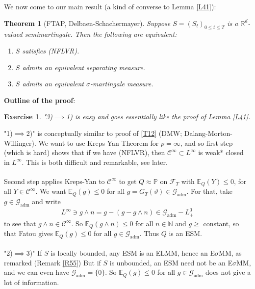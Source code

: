 \documentclass[12pt,a4paper, twoside]{article}
\newtheorem{thm}{Theorem}[section]
\newtheorem{exe}{Exercise}[section]
\theoremstyle{definition}
\newcommand{\EE}{\mathbb{E}} %
\newcommand{\PP}{\mathbb{P}} %
\begin{document}
\newpage
We now come to our main result (a kind of converse to Lemma \ref{L41}):
\begin{mdframed}[backgroundcolor=yellow!20, topline=true, linewidth=2.0pt]
\begin{thm}[FTAP, Delbaen-Schachermayer] \label{T45} Suppose $S=(S_t)_{0 \leq t \leq T}$ is a $\mathbb{R}^d$-valued semimartingale. Then the following are equivalent:
\begin{enumerate}
\item $S$ satisfies (NFLVR).
\item $S$ admits an equivalent separating measure.
\item $S$ admits an equivalent $\sigma$-martingale measure. 
\end{enumerate}
\end{thm}
\end{mdframed}
\noindent \textbf{Outline of  the proof}:
\begin{exe} \label{ex16} "3)$\implies$1) is easy and goes essentially like the proof of Lemma \ref{L41}.
\end{exe}
\noindent "1)$\implies$2)" is conceptually similar to proof of \ref{T12} (DMW; Dalang-Morton-Willinger). We want to use Kreps-Yan Theorem for $p= \infty$, and so first step (which is hard) shows that if we have (NFLVR), then $\mathcal{C}^\infty \subset L^\infty$ is weak* closed in $L^\infty$. This is both difficult and remarkable,  see later. \\
\\
Second step applies Kreps-Yan to $\mathcal{C}^\infty$ to get $Q \approx \PP$ on $\mathcal{F}_T$ with $\EE_Q(Y) \leq 0$, for all $Y \in \mathcal{C}^\infty$. We want $\EE_Q(g) \leq 0$ for all $g= G_T( \vartheta) \in \mathcal{G}_\text{adm}$. For that, take $g \in \mathcal{G}_\text{adm}$ and write 
\begin{align*}
L^\infty \ni g \wedge n = g-(g-g \wedge n) \in \mathcal{G}_\text{adm}-L_+^0
\end{align*}
to see that $g \wedge n \in \mathcal{C}^\infty$. So $\EE_Q(g \wedge n) \leq 0$ for all $n \in \mathbb{N}$ and $g \geq$ constant, so that Fatou gives $\EE_Q(g) \leq 0$ for all $g \in \mathcal{G}_\text{adm}$. Thus $Q$ is an ESM. 
\\\\
"2)$\implies$3)" If $S$ is locally bounded, any ESM is an ELMM, hence an E$\sigma$MM, as remarked (Remark \ref{R55}) But if $S$ is unbounded, an ESM need not be an E$\sigma$MM, and we can even have $\mathcal{G}_\text{adm}= \{0\}$. So $\EE_Q(g) \leq 0$ for all $g \in \mathcal{G}_\text{adm}$ does not give a lot of information. \\
\end{document}
